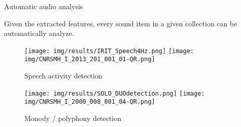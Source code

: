 \documentclass[final, hyperref, table]{beamer}
\begin{document}
\begin{frame}[containsverbatim]{}
\begin{columns}[T]
\begin{column}[T]{.5\linewidth}
\begin{block}{Automatic audio analysis}
\begin{center}
\begin{minipage}[h]{0.97\linewidth}
\begin{beamerboxesrounded}
        Given the extracted features, every sound item in a given
        collection can be automatically analyze. 
      \end{beamerboxesrounded}

      \begin{center}
        \begin{figure}[h]
          \centering
          \texttt{[image: img/results/IRIT\_Speech4Hz.png]}
\texttt{[image: img/CNRSMH\_I\_2013\_201\_001\_01-QR.png]}
          \caption{Speech activity detection}
          \label{fig:TS_SAD}
        \end{figure}
        \begin{figure}[h]
          \centering
          \texttt{[image: img/results/SOLO\_DUOdetection.png]}
\texttt{[image: img/CNRSMH\_I\_2000\_008\_001\_04-QR.png]}  
          \caption{Monody / polyphony detection}
          \label{fig:TS_Monopoly}
        \end{figure}
      \end{center}
    \end{minipage}
  \end{center}
\end{block}
%     
 


\end{column}
\end{columns}
\end{frame}
\end{document}
